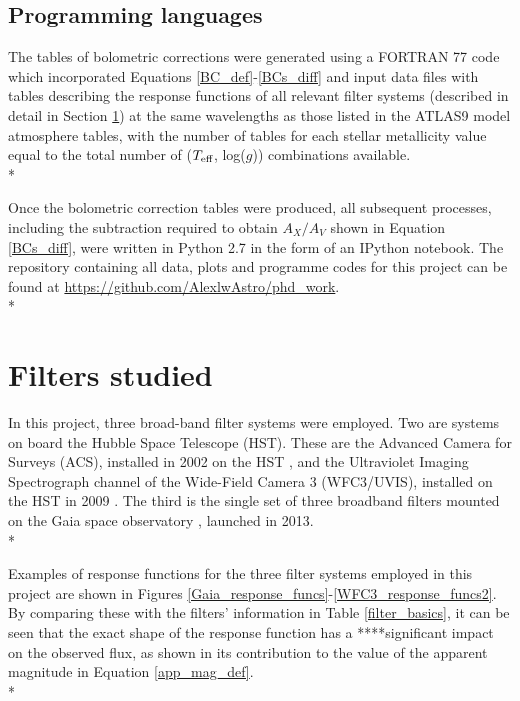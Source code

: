 \documentclass[12pt, a4paper]{report}
\begin{document}
\subsection{Programming languages}
The tables of bolometric corrections were generated using a FORTRAN 77 code which incorporated Equations \ref{BC_def}-\ref{BCs_diff} and input data files with tables describing the response functions of all relevant filter systems (described in detail in Section \ref{filter_desc}) at the same wavelengths as those listed in the ATLAS9 model atmosphere tables, with the number of tables for each stellar metallicity value equal to the total number of ($T_{\textnormal{eff}}$, log($g$)) combinations available.\\*

Once the bolometric correction tables were produced, all subsequent processes, including the subtraction required to obtain $A_{X}/A_{V}$ shown in Equation \ref{BCs_diff}, were written in Python 2.7 in the form of an IPython notebook. The repository containing all data, plots and programme codes for this project can be found at \protect\url{https://github.com/AlexlwAstro/phd_work}.\\*

\section{Filters studied} \label{filter_desc}
In this project, three broad-band filter systems were employed. Two are systems on board the Hubble Space Telescope (HST). These are the Advanced Camera for Surveys (ACS), installed in 2002 on the HST \citep{2007AJ....133.1658S}, and the Ultraviolet Imaging Spectrograph channel of the Wide-Field Camera 3 (WFC3/UVIS), installed on the HST in 2009 \citep{2010wfc..rept...14K,2010SPIE.7731E..0ZM}. The third is the single set of three broadband filters mounted on the Gaia space observatory \citep{2010A&A...523A..48J}, launched in 2013. \\*

Examples of response functions for the three filter systems employed in this project are shown in Figures \ref{Gaia_response_funcs}-\ref{WFC3_response_funcs2}. By comparing these with the filters' information in Table \ref{filter_basics}, it can be seen that the exact shape of the response function has a ****significant impact on the observed flux, as shown in its contribution to the value of the apparent magnitude in Equation \ref{app_mag_def}.\\*
\end{document}
